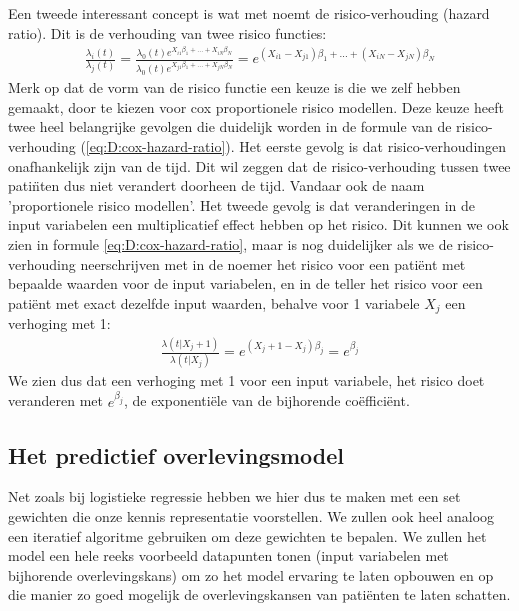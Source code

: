 Een tweede interessant concept is wat met noemt de risico-verhouding (hazard ratio). Dit is de verhouding van twee risico functies:
\begin{equation}
\label{eq:D:cox-hazard-ratio}
\begin{split}
\frac{\lambda_{i}(t)}{\lambda_{j}(t)} 
= \frac{\lambda_{0}(t)e^{X_{i1}\beta_{1} + ... + X_{iN}\beta_{N}}}{\lambda_{0}(t)e^{X_{j1}\beta_{1} + ... + X_{jN}\beta_{N}}}
= e^{(X_{i1}-X_{j1})\beta_{1} + ... + (X_{iN}-X_{jN})\beta_{N}}
\end{split}
\end{equation}
Merk op dat de vorm van de risico functie een keuze is die we zelf hebben gemaakt, door te kiezen voor cox proportionele risico modellen. Deze keuze heeft twee heel belangrijke gevolgen die duidelijk worden in de formule van de risico-verhouding (\ref{eq:D:cox-hazard-ratio}). Het eerste gevolg is dat risico-verhoudingen onafhankelijk zijn van de tijd. Dit wil zeggen dat de risico-verhouding tussen twee pati\"nten dus niet verandert doorheen de tijd. Vandaar ook de naam 'proportionele risico modellen'. Het tweede gevolg is dat veranderingen in de input variabelen een multiplicatief effect hebben op het risico. Dit kunnen we ook zien in formule \ref{eq:D:cox-hazard-ratio}, maar is nog duidelijker als we de risico-verhouding neerschrijven met in de noemer het risico voor een pati\"ent met bepaalde waarden voor de input variabelen, en in de teller het risico voor een pati\"ent met exact dezelfde input waarden, behalve voor 1 variabele $X_{j}$ een verhoging met 1:
\begin{equation}
\begin{split}
\frac{\lambda(t|X_{j}+1)}{\lambda(t|X_{j})} = e^{(X_{j}+1-X_{j})\beta_{j}} = e^{\beta_{j}}
\end{split}
\end{equation}
We zien dus dat een verhoging met 1 voor een input variabele, het risico doet veranderen met $e^{\beta_{j}}$, de exponenti\"ele van de bijhorende co\"effici\"ent.

\subsection{Het predictief overlevingsmodel}
Net zoals bij logistieke regressie hebben we hier dus te maken met een set gewichten die onze kennis representatie voorstellen. We zullen ook heel analoog een iteratief algoritme gebruiken om deze gewichten te bepalen. We zullen het model een hele reeks voorbeeld datapunten tonen (input variabelen met bijhorende overlevingskans) om zo het model ervaring te laten opbouwen en op die manier zo goed mogelijk de overlevingskansen van pati\"enten te laten schatten.

